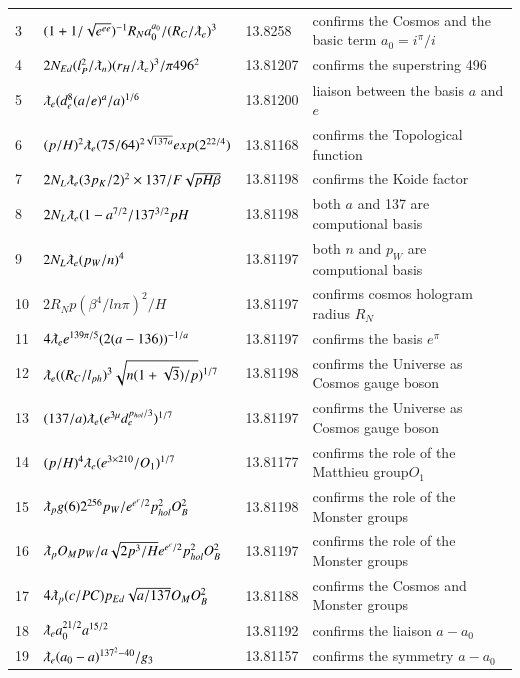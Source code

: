 \documentclass[a4paper,9pt]{article}
\begin{document}
\begin{appendix}
\begin{table}
\begin{tabular}{llll}
    3 & $ (1+1/\sqrt{e^{e e}})^{-1} R_N a_0^{a_0} / (R_C/\lambdabar_e)^3 $ & 13.8258 & confirms the Cosmos and the basic term $a_0 = i^\pi/i$ \\
  
  
  4 & $2N_{Ed}(l_P^2/\lambdabar_n) (r_H/\lambdabar_e)^3/ \pi 496^2 $ & 13.81207 & confirms the superstring 496\\
    5 & $ \lambdabar_{e} (d_e^8(a/e)^a/a)^{1/6}  $ & 13.81200 & liaison between the basis $a$ and $e$ \\
     6 & $ (p/H)^2\lambdabar_{e}(75/64)^{2\sqrt{137 a}}exp(2^{22/4})  $ & 13.81168 & confirms the Topological function \\
    7 & $2 N_L \lambdabar_{e} (3p_K/2)^2 \times 137/F\sqrt{pH\beta}  $ & 13.81198 & confirms the Koide factor \\
    8 & $2 N_L \lambdabar_{e} (1-a^{7/2}/137^{3/2}pH  $ & 13.81198 & both $a$ and 137 are computional basis \\
    9 & $2 N_L \lambdabar_{e} (p_W/n)^4  $ & 13.81197 & both $n$ and $p_W$ are computional basis \\
    10 & $ 2R_Np(\beta^4/ln\pi)^2/H $ & 13.81197 & confirms cosmos hologram radius $R_N$ \\
    11 & $4 \lambdabar_{e} e^{139\pi /5} (2(a-136))^{-1/a}  $ & 13.81197 & confirms the basis $e^\pi$ \\
    12 & $ \lambdabar_{e} ((R_C/l_{ph})^3 \sqrt{n(1+\sqrt3)/p})^{1/7} $ & 13.81198 & confirms the Universe as Cosmos gauge boson \\
    13 & $ (137/a)\lambdabar_{e} (e^{3\mu}d_e^{p_{hol}/3} )^{1/7} $ & 13.81197 & confirms the Universe as Cosmos gauge boson \\
    14 & $ (p/H)^4 \lambdabar_{e} (e^{3\times 210}/O_1)^{1/7} $ & 13.81177 & confirms the role of the Matthieu group$ O_1$ \\
    15 & $ \lambdabar_{p} g(6) 2^{256} p_W /e^{e^{e}/2} p_{hol}^2 O_B^2 $ & 13.81198 & confirms the role of the Monster groups \\ 
    16 & $ \lambdabar_{p} O_M p_W /a \sqrt{2p^3/H} e^{e^{e}/2} p_{hol}^2 O_B^2 $ & 13.81197 & confirms the role of the Monster groups \\ 
    17 & $ 4 \lambdabar_{p} (c/PC) p_{Ed} \sqrt{a/137} O_M O_B^2 $ & 13.81188 & confirms the Cosmos and Monster groups \\   
    18 & $ \lambdabar_{e} a_0^{21/2} a^{15/2}   $ & 13.81192 & confirms the liaison $a-a_0$ \\
    19 & $ \lambdabar_{e}(a_0-a)^{137^2-40}/g_3   $ & 13.81157 & confirms the symmetry $a-a_0$ \\

\end{tabular}
\end{table}
\end{appendix}
\end{document}
